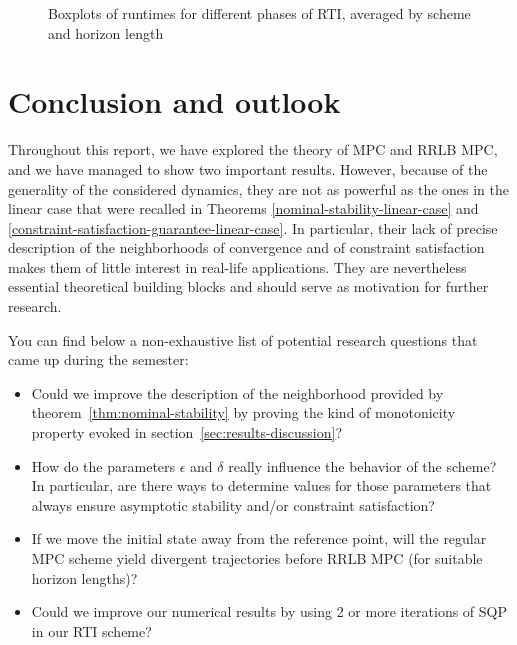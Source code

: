 \documentclass[12pt]{article}
\begin{document}
\begin{itemize}[label=\textbullet]
\begin{figure}[!ht]
		\caption{Boxplots of runtimes for different phases of RTI, averaged by scheme and horizon length}
		\label{fig:runtimes}
	\end{figure}

\end{itemize}

\section{Conclusion and outlook}

Throughout this report, we have explored the theory of MPC and RRLB MPC, and we have managed to show two important results.
However, because of the generality of the considered dynamics, they are not as powerful as the ones in the linear case that were recalled in Theorems \ref{nominal-stability-linear-case} and \ref{constraint-satisfaction-guarantee-linear-case}.
In particular, their lack of precise description of the neighborhoods of convergence and of constraint satisfaction makes them of little interest in real-life applications.
They are nevertheless essential theoretical building blocks and should serve as motivation for further research.

You can find below a non-exhaustive list of potential research questions that came up during the semester:
\begin{itemize}[label=\textbullet]
	\item Could we improve the description of the neighborhood provided by theorem~\ref{thm:nominal-stability} by proving the kind of monotonicity property evoked in section~\ref{sec:results-discussion}?

	\item How do the parameters $\epsilon$ and $\delta$ really influence the behavior of the scheme? In particular, are there ways to determine values for those parameters that always ensure asymptotic stability and/or constraint satisfaction?

	\item If we move the initial state away from the reference point, will the regular MPC scheme yield divergent trajectories before RRLB MPC (for suitable horizon lengths)?

	\item Could we improve our numerical results by using 2 or more iterations of SQP in our RTI scheme?
\end{itemize}
\end{document}
